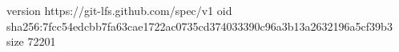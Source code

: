 version https://git-lfs.github.com/spec/v1
oid sha256:7fcc54edcbb7fa63cae1722ac0735cd374033390c96a3b13a2632196a5cf39b3
size 72201
